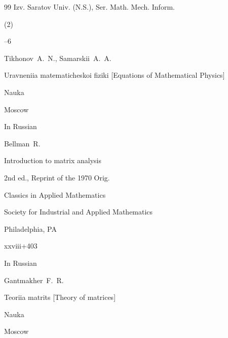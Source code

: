 \begin{thebibliography}{99}
\jour Izv. Saratov Univ. (N.S.), Ser. Math. Mech. Inform.



(2)

--6




\by Tikhonov~A.~N., Samarskii~A.~A.

\book Uravneniia matematicheskoi fiziki \rm [Equations of Mathematical Physics]


\publ Nauka

\publaddr Moscow

\lang In Russian







\by Bellman~R.

\book Introduction to matrix analysis

\bookinfo 2nd ed., Reprint of the 1970 Orig.

\serial Classics in Applied Mathematics



\publ Society for Industrial and Applied Mathematics

\publaddr Philadelphia, PA

\totalpages xxviii+403








\lang In Russian

\by Gantmakher~F.~R.

\book Teoriia matrits \rm [Theory of matrices]


\publ Nauka

\publaddr Moscow








\end{thebibliography}
